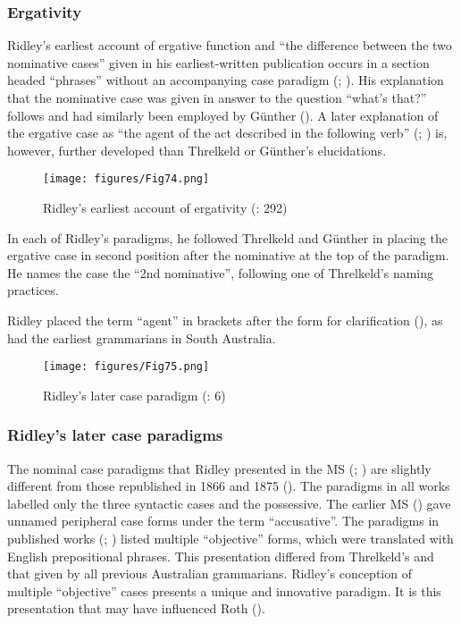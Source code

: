 \subsubsection{Ergativity} 
\label{sec:key:4.5.4.1}

Ridley’s earliest account of ergative function and “the difference between the two nominative cases” given in his earliest-written publication occurs in a section headed “phrases” without an accompanying case paradigm (\citeyear[292]{ridley_kamilaroi_1856}; ). His explanation that the nominative case was given in answer to the question “what’s that?” follows \citet[14]{threlkeld_australian_1834} and had similarly been employed by Günther (). A later explanation of the ergative case as “the agent of the act described in the following verb” (\citeyear{ridley_kamilaroi_1855}; ) is, however, further developed than Threlkeld or Günther’s elucidations.

\begin{figure}
\texttt{[image: figures/Fig74.png]}
\caption{Ridley’s earliest account of ergativity (\citeyear{ridley_kamilaroi_1856}: 292)}
\label{fig:4:74}
\end{figure}


In each of Ridley’s paradigms, he followed Threlkeld and Günther in placing the ergative case in second position after the nominative at the top of the paradigm. He names the case the “2nd nominative”, following one of Threlkeld’s naming practices. 

Ridley placed the term “agent” in brackets after the form for clarification (), as had the earliest grammarians in South Australia. 

\begin{figure}
\texttt{[image: figures/Fig75.png]}
\caption{Ridley’s later case paradigm (\citeyear{ridley_kamilaroi_1855}: 6)}
\label{fig:4:75}
\end{figure}


\subsubsection{Ridley’s later case paradigms}

The nominal case paradigms that Ridley presented in the MS (\citeyear{ridley_kamilaroi_1855}; ) are slightly different from those republished in 1866 and 1875 (). The paradigms in all works labelled only the three syntactic cases and the possessive. The earlier MS (\citeyear{ridley_kamilaroi_1855}) gave unnamed peripheral case forms under the term ``accusative''. The paradigms in published works (\citeyear{ridley_kamilaroi_1866}; \citeyear{ridley_kamilaroi_1875}) listed multiple “objective” forms, which were translated with English prepositional phrases. This presentation differed from Threlkeld’s and that given by all previous Australian grammarians. Ridley’s conception of multiple “objective” cases presents a unique and innovative paradigm. It is this presentation that may have influenced Roth ().

